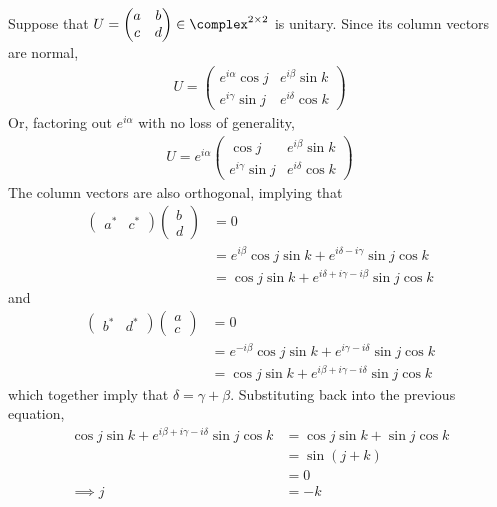 \begingroup
\newcommand{\expo}[1]{\exp \left( #1 \right)}
%
Suppose that $U = \begin{pmatrix} a & b \\ c & d \end{pmatrix} \in \complex^{2 \times 2}$ is unitary.
%
Since its column vectors are normal,
%
\begin{align*}
U = \begin{pmatrix} e^{i\alpha} \cos j & e^{i\beta} \sin k \\ e^{i\gamma} \sin j & e^{i\delta} \cos k \end{pmatrix}
\end{align*}
%
Or, factoring out $e^{i\alpha}$ with no loss of generality,
\begin{align*}
U = e^{i\alpha} \begin{pmatrix} \cos j & e^{i\beta} \sin k \\ e^{i\gamma} \sin j & e^{i\delta} \cos k \end{pmatrix}
\end{align*}
%
The column vectors are also orthogonal, implying that
%
\begin{align*}
\begin{pmatrix} a^* & c^* \end{pmatrix} \begin{pmatrix} b \\ d \end{pmatrix} &= 0 \\
&= e^{i\beta} \cos j \sin k + e^{i\delta-i\gamma} \sin j \cos k \\
&= \cos j \sin k + e^{i\delta+i\gamma-i\beta} \sin j \cos k
\end{align*}
%
and
%
\begin{align*}
\begin{pmatrix} b^* & d^* \end{pmatrix} \begin{pmatrix} a \\ c \end{pmatrix} &= 0 \\
&= e^{-i\beta} \cos j \sin k + e^{i\gamma-i\delta} \sin j \cos k \\
&= \cos j \sin k + e^{i\beta+i\gamma-i\delta} \sin j \cos k
\end{align*}
%
which together imply that $\delta = \gamma + \beta$.
%
Substituting back into the previous equation,
%
\begin{align*}
\cos j \sin k + e^{i\beta+i\gamma-i\delta} \sin j \cos k &= \cos j \sin k + \sin j \cos k \\
&= \sin \left( j + k \right) \\
&= 0 \\
\implies j &= -k
\end{align*}
